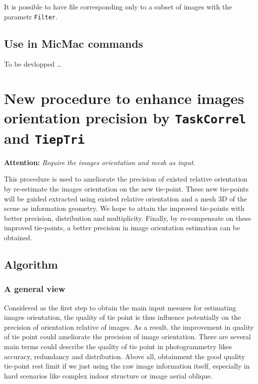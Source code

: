 It is possible to have file corresponding only to a subset of images with
the parametr {\tt Filter}.

\subsection{Use in MicMac commands}

To be devlopped \dots 


\section{New procedure to enhance images orientation precision by {\tt TaskCorrel} and {\tt TiepTri}}
\textbf{Attention:} \textit{Require the images orientation and mesh as input.}


This procedure is used to ameliorate the precision of existed relative orientation by re-estimate the images orientation on the new tie-point. These new tie-points will be guided extracted using existed relative orientation and a mesh 3D of the scene as information geometry. We hope to attain the improved tie-points with better precision, distribution and multiplicity. Finally, by re-compensate on these improved tie-points, a better precision in image orientation estimation can be obtained.


\subsection{Algorithm}
\subsubsection{A general view}
Considered as the first step to obtain the main input mesures for estimating images orientation, the quality of tie point is thus influence potentially on the precision of orientation relative of images. 
As a result, the improvement in quality of tie point could ameliorate the precision of image orientation.
There are several main terms could describe the quality of tie point in photogrammetry likes accuracy, redundancy and distribution.
Above all, obtainment the good quality tie-point rest limit if we just using the raw image information itself, especially in hard scenarios like complex indoor structure or image aerial oblique.  
\newline


